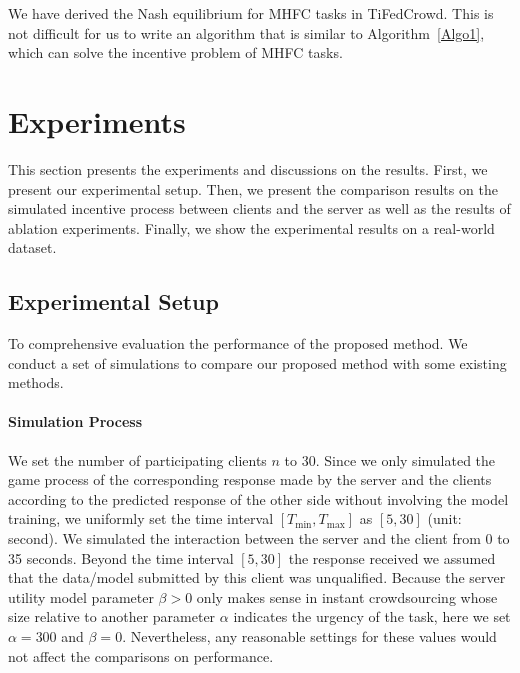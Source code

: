\documentclass[final,1p,times]{elsarticle}
\begin{document}
We have derived the Nash equilibrium for MHFC tasks in TiFedCrowd. This is not difficult for us to write an algorithm that is similar to Algorithm~\ref{Algo1}, which can solve the incentive problem of MHFC tasks.

\section{Experiments} \label{sec:exp}
This section presents the experiments and discussions on the results. First, we present our experimental setup. Then, we present the comparison results on the simulated incentive process between clients and the server as well as the results of ablation experiments. Finally, we show the experimental results on a real-world dataset.

\subsection{Experimental Setup}
To comprehensive evaluation the performance of the proposed method. We conduct a set of simulations to compare our proposed method with some existing methods.
\paragraph{\textbf{Simulation Process}}
We set the number of participating clients $n$ to 30. Since we only simulated the game process of the corresponding response made by the server and the clients according to the predicted response of the other side without involving the model training, we uniformly set the time interval $[T_{\min},T_{\max}]$ as $[5,30]$ (unit: second). We simulated the interaction between the server and the client from 0 to 35 seconds. Beyond the time interval $[5,30]$ the response received we assumed that the data/model submitted by this client was unqualified. Because the server utility model parameter $\beta>0$ only makes sense in instant crowdsourcing whose size relative to another parameter $\alpha$ indicates the urgency of the task, here we set $\alpha=300$ and $\beta=0$. Nevertheless, any reasonable settings for these values would not affect the comparisons on performance. 
\end{document}
